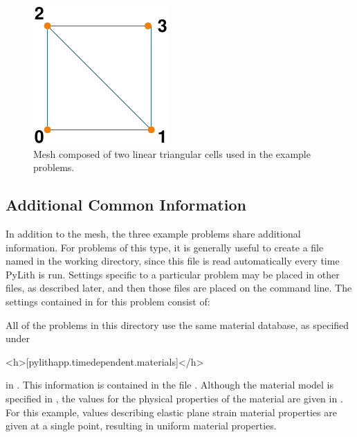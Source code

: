 \begin{figure}
  \includegraphics{examples/figs/twotri3-mesh}
  \caption{Mesh composed of two linear triangular cells used in the
    example problems.}
  \label{fig:twotri3-mesh}
\end{figure}


\subsection{Additional Common Information}

In addition to the mesh, the three example problems share additional
information. For problems of this type, it is generally useful to
create a file named  in the working directory,
since this file is read automatically every time PyLith is
run. Settings specific to a particular problem may be placed in other
 files, as described later, and then those files are
placed on the command line. The settings contained in
 for this problem consist of:
\begin{inventory}
\end{inventory}
All of the problems in this directory use the same material database,
as specified under 
\begin{cfg}
<h>[pylithapp.timedependent.materials]</h>
\end{cfg}
in . This information is contained in the file
. Although the material model is specified
in , the values for the physical properties
of the material are given in . For this
example, values describing elastic plane strain material properties
are given at a single point, resulting in uniform material properties.


